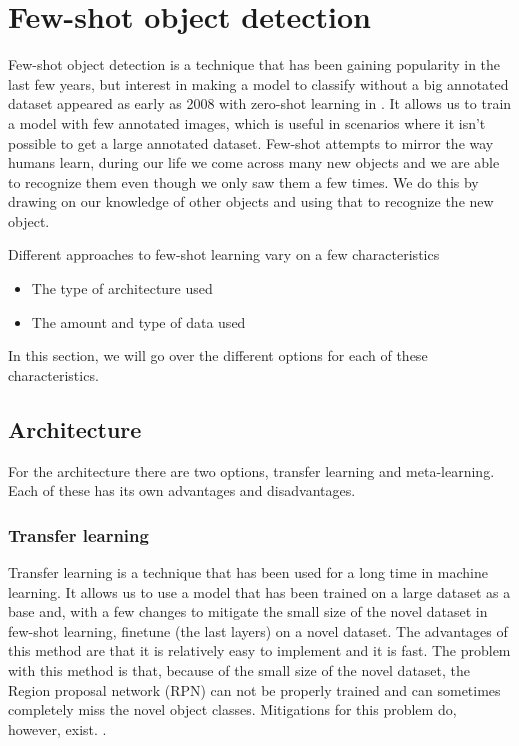 

\section{Few-shot object detection}
Few-shot object detection is a technique that has been gaining popularity in the last few years, but interest in making a model to classify without a big annotated dataset appeared as early as 2008 with zero-shot learning in \citet{aaai08-132}. It allows us to train a model with few annotated images, which is useful in scenarios where it isn't possible to get a large annotated dataset. Few-shot attempts to mirror the way humans learn, during our life we come across many new objects and we are able to recognize them even though we only saw them a few times. We do this by drawing on our knowledge of other objects and using that to recognize the new object\cite{biederman1987recognition}. 

Different approaches to few-shot learning vary on a few characteristics
\begin{itemize}
	\item The type of architecture used
	\item The amount and type of data used
\end{itemize}

In this section, we will go over the different options for each of these characteristics.

\subsection{Architecture}

For the architecture there are two options, transfer learning and meta-learning. Each of these has its own advantages and disadvantages.

\subsubsection*{Transfer learning}

Transfer learning is a technique that has been used for a long time in machine learning. It allows us to use a model that has been trained on a large dataset as a base and, with a few changes to mitigate the small size of the novel dataset in few-shot learning, finetune (the last layers) on a novel dataset. The advantages of this method are that it is relatively easy to implement and it is fast. The problem with this method is that, because of the small size of the novel dataset, the Region proposal network (RPN) can not be properly trained and can sometimes completely miss the novel object classes. Mitigations for this problem do, however, exist. \cite{DBLP:journals/corr/abs-2011-10142, VU2022104398, DBLP:journals/corr/abs-2105-09491, DBLP:journals/corr/abs-2103-05950,rs14143255}.

